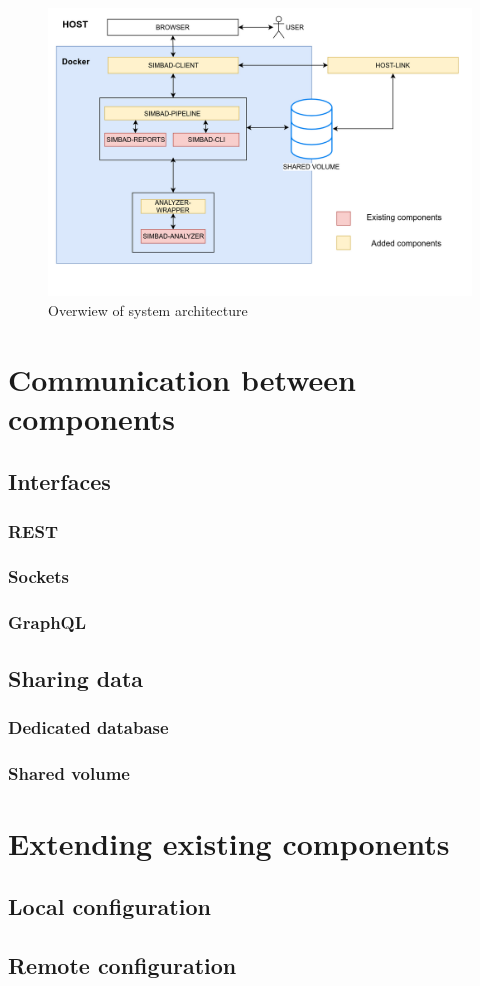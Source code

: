 \begin{figure}[h!]
	\centering
		\includegraphics[width=0.9\linewidth]{diagrams/architecture-diagram.png}
	\caption{Overwiew of system architecture}
	\label{fig:architecture}
\end{figure}
\section{Communication between components}
\subsection{Interfaces}
\subsubsection{REST}
\subsubsection{Sockets}
\subsubsection{GraphQL}
\subsection{Sharing data}
\subsubsection{Dedicated database}
\subsubsection{Shared volume}
\section{Extending existing components}
\subsection{Local configuration}
\subsection{Remote configuration}

